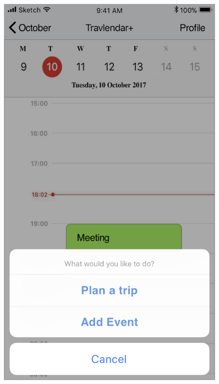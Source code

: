 \begin{enumerate}
\begin{figure}[H]
				\includegraphics[scale=0.25]{Images/Sketch/Plan_Trip_1}
				\hspace{0.5cm}

\end{figure}
\end{enumerate}
